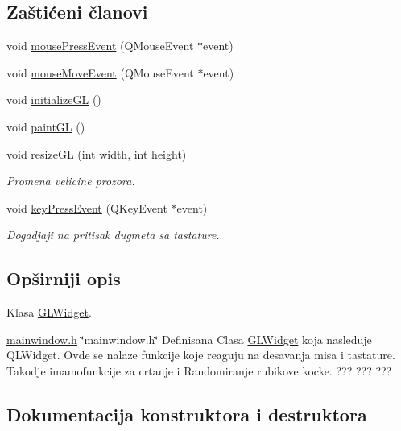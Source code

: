 \subsection*{Zaštićeni članovi}
\begin{DoxyCompactItemize}
\item 
void \hyperlink{classGLWidget_ab144cc8064c1bbf6d0ef0646ca0bd06c}{mouse\+Press\+Event} (Q\+Mouse\+Event $\ast$event)
\item 
void \hyperlink{classGLWidget_a9043bac13d6f0a5307ea5c7f9b3caa50}{mouse\+Move\+Event} (Q\+Mouse\+Event $\ast$event)
\item 
void \hyperlink{classGLWidget_a7fab13e8cc9fc0730ca54c08b2c923a7}{initialize\+GL} ()
\item 
void \hyperlink{classGLWidget_a640b5570cb2b37724fd5b58a77339c5e}{paint\+GL} ()
\item 
void \hyperlink{classGLWidget_ac0d2a8ecf60907a81c0d73475d851025}{resize\+GL} (int width, int height)
\begin{DoxyCompactList}\small\item\em Promena velicine prozora. \end{DoxyCompactList}\item 
void \hyperlink{classGLWidget_a43dfdc9164dfacb939a173e725651fa9}{key\+Press\+Event} (Q\+Key\+Event $\ast$event)
\begin{DoxyCompactList}\small\item\em Dogadjaji na pritisak dugmeta sa tastature. \end{DoxyCompactList}\end{DoxyCompactItemize}


\subsection{Opširniji opis}
Klasa \hyperlink{classGLWidget}{G\+L\+Widget}. 

\hyperlink{mainwindow_8h_source}{mainwindow.\+h} \char`\"{}mainwindow.\+h\char`\"{} Definisana Clasa \hyperlink{classGLWidget}{G\+L\+Widget} koja nasleduje Q\+L\+Widget. Ovde se nalaze funkcije koje reaguju na desavanja misa i tastature. Takodje imamofunkcije za crtanje i Randomiranje rubikove kocke. ??? ??? ??? 

\subsection{Dokumentacija konstruktora i destruktora}
